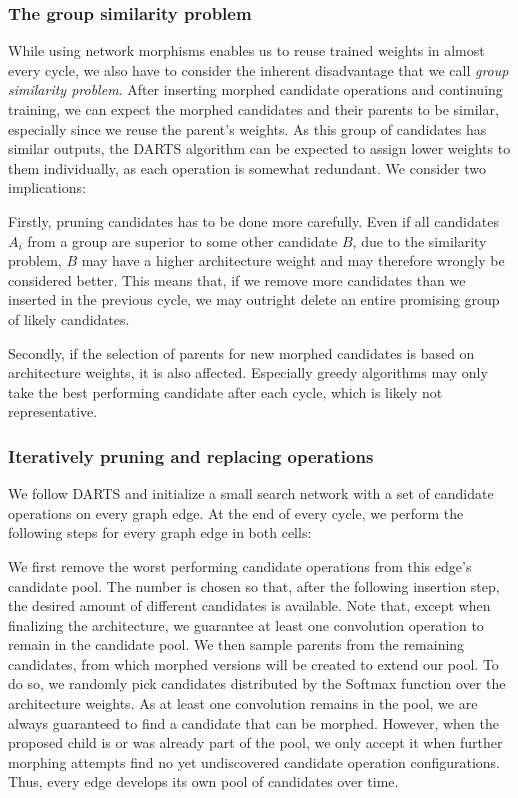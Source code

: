 \documentclass[conference]{IEEEtran}
\begin{document}
\subsubsection{The group similarity problem}
\label{sss_methods_groupproblem}

While using network morphisms enables us to reuse trained weights in almost every cycle, we also have to consider the inherent disadvantage that we call \textit{group similarity problem}. After inserting morphed candidate operations and continuing training, we can expect the morphed candidates and their parents to be similar, especially since we reuse the parent's weights.
As this group of candidates has similar outputs, the DARTS algorithm can be expected to assign lower weights to them individually, as each operation is somewhat redundant. We consider two implications:

Firstly, pruning candidates has to be done more carefully. Even if all candidates $A_i$ from a group are superior to some other candidate $B$, due to the similarity problem, $B$ may have a higher architecture weight and may therefore wrongly be considered better.
This means that, if we remove more candidates than we inserted in the previous cycle, we may outright delete an entire promising group of likely candidates. 

Secondly, if the selection of parents for new morphed candidates is based on architecture weights, it is also affected. Especially greedy algorithms may only take the best performing candidate after each cycle, which is likely not representative.






\subsubsection{Iteratively pruning and replacing operations}
\label{sss_methods_rep}

We follow DARTS and initialize a small search network with a set of candidate operations on every graph edge. At the end of every cycle, we perform the following steps for every graph edge in both cells:

We first remove the worst performing candidate operations from this edge's candidate pool. The number is chosen so that, after the following insertion step, the desired amount of different candidates is available.
Note that, except when finalizing the architecture, we guarantee at least one convolution operation to remain in the candidate pool.
We then sample parents from the remaining candidates, from which morphed versions will be created to extend our pool. To do so, we randomly pick candidates distributed by the Softmax function over the architecture weights.
As at least one convolution remains in the pool, we are always guaranteed to find a candidate that can be morphed. However, when the proposed child is or was already part of the pool, we only accept it when further morphing attempts find no yet undiscovered candidate operation configurations.
Thus, every edge develops its own pool of candidates over time.
\end{document}
